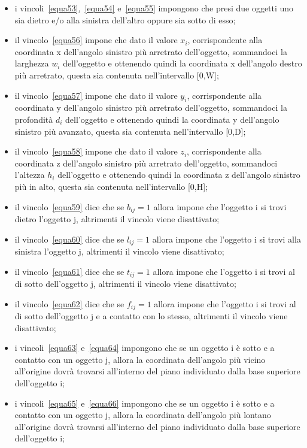 \begin{itemize}
	\item i vincoli~\eqref{equa53},~\eqref{equa54} e~\eqref{equa55} impongono che presi due oggetti uno sia dietro e/o alla sinistra dell'altro oppure sia sotto di esso;
	\item il vincolo~\eqref{equa56} impone che dato il valore $x_i$, corrispondente alla coordinata x dell'angolo sinistro più arretrato dell'oggetto, sommandoci la larghezza $w_i$ dell'oggetto e ottenendo quindi la coordinata x dell'angolo destro più arretrato, questa sia contenuta nell'intervallo [0,W];
	\item il vincolo~\eqref{equa57} impone che dato il valore $y_i$, corrispondente alla coordinata y dell'angolo sinistro più arretrato dell'oggetto, sommandoci la profondità $d_i$ dell'oggetto e ottenendo quindi la coordinata y dell'angolo sinistro più avanzato, questa sia contenuta nell'intervallo [0,D];
	\item il vincolo~\eqref{equa58} impone che dato il valore $z_i$, corrispondente alla coordinata z dell'angolo sinistro più arretrato dell'oggetto, sommandoci l'altezza $h_i$ dell'oggetto e ottenendo quindi la coordinata z dell'angolo sinistro più in alto, questa sia contenuta nell'intervallo [0,H];
	\item il vincolo~\eqref{equa59} dice che se $b_{ij} = 1$ allora impone che l'oggetto i si trovi dietro l'oggetto j, altrimenti il vincolo viene disattivato;
	\item il vincolo~\eqref{equa60} dice che se $l_{ij} = 1$ allora impone che l'oggetto i si trovi alla sinistra l'oggetto j, altrimenti il vincolo viene disattivato;
	\item il vincolo~\eqref{equa61} dice che se $t_{ij} = 1$ allora impone che l'oggetto i si trovi al di sotto dell'oggetto j, altrimenti il vincolo viene disattivato;
	\item il vincolo~\eqref{equa62} dice che se $f_{ij} = 1$ allora impone che l'oggetto i si trovi al di sotto dell'oggetto j e a contatto con lo stesso, altrimenti il vincolo viene disattivato;
	\item i vincoli~\eqref{equa63} e~\eqref{equa64} impongono che se un oggetto i è sotto e a contatto con un oggetto j, allora la coordinata dell'angolo più vicino all'origine dovrà trovarsi all'interno del piano individuato dalla base superiore dell'oggetto i;
	\item i vincoli~\eqref{equa65} e~\eqref{equa66} impongono che se un oggetto i è sotto e a contatto con un oggetto j, allora la coordinata dell'angolo più lontano all'origine dovrà trovarsi all'interno del piano individuato dalla base superiore dell'oggetto i;

\end{itemize}
